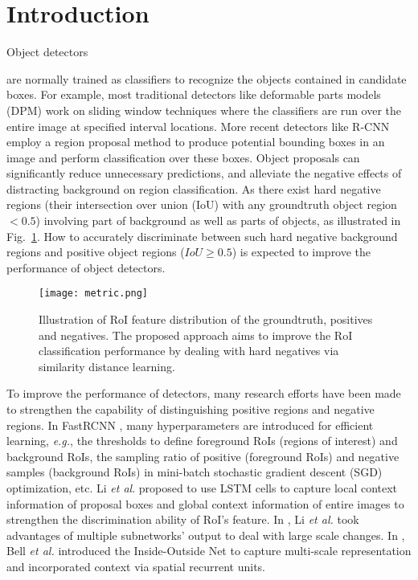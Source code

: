 \documentclass{article}
\begin{document}
\section{Introduction}
\label{sec:intro}

Object detectors {\cite{multiregion,girshick2014rich,girshick2015fast,ren2015faster,he2014spatial,song2011contextualizing,insideoutside} are normally trained as classifiers to recognize the objects contained in candidate boxes. For example, most traditional detectors like deformable parts models (DPM) \cite{DPM} work on sliding window techniques where the classifiers are run over the entire image at specified interval locations. More recent detectors like R-CNN \cite{girshick2014rich} employ a region proposal method to produce potential bounding boxes in an image and perform classification over these boxes. Object proposals can significantly reduce unnecessary predictions, and alleviate the negative effects of distracting background on region classification.
As there exist hard negative regions (their intersection over union (IoU) with any groundtruth object region $< 0.5$) involving part of background as well as parts of objects, as illustrated in Fig.~\ref{fig:metric}. How to accurately discriminate between such hard negative background regions and positive object regions ($IoU \ge 0.5$) is expected to improve the performance of object detectors.

\begin{figure}[]
\centering
\vspace*{-5pt}
\texttt{[image: metric.png]}
\caption{Illustration of RoI feature distribution of the groundtruth, positives and negatives. The proposed approach aims to improve the RoI classification performance by dealing with hard negatives via similarity distance learning.}
\label{fig:metric}
\vspace*{-15pt}
\end{figure}

To improve the performance of detectors, many research efforts have been made to strengthen the capability of distinguishing positive regions and negative regions. In FastRCNN \cite{girshick2015fast}, many hyperparameters are introduced for efficient learning, \textit{e.g.}, the thresholds to define foreground RoIs (regions of interest) and background RoIs, the sampling ratio of positive (foreground RoIs) and negative samples (background RoIs) in mini-batch stochastic gradient descent (SGD) optimization, etc. Li \textit{et al}. \cite{attentivecontext} proposed to use LSTM cells \cite{hochreiter1997long} to capture local context information of proposal boxes and global context information of entire images to strengthen the discrimination ability of RoI's feature. In \cite{li2015scale}, Li \textit{et al.} took advantages of multiple subnetworks' output to deal with large scale changes. In \cite{insideoutside}, Bell \textit{et al.} introduced the Inside-Outside Net to capture multi-scale representation and incorporated context via spatial recurrent units.

}
\end{document}
